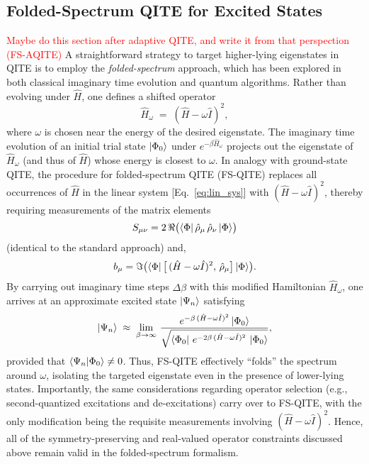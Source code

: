 \documentclass[aip,jcp,amsmath,amssymb, reprint]{revtex4-1}
\begin{document}
\subsection{Folded-Spectrum QITE for Excited States}
\textcolor{red}{Maybe do this section after adaptive QITE, and write it from that perspection (FS-AQITE)}
A straightforward strategy to target higher-lying eigenstates in QITE is to employ the \textit{folded-spectrum} approach, which has been explored in both classical imaginary time evolution and quantum algorithms.\cite{foldedSpectrumRefs} Rather than evolving under $\hat{H}$, one defines a shifted operator
\begin{equation}
\hat{H}_\omega \;=\; (\hat{H} - \omega \hat{I})^2,
\end{equation}
where $\omega$ is chosen near the energy of the desired eigenstate. The imaginary time evolution of an initial trial state $\ket{\Phi_0}$ under $e^{-\beta \hat{H}_\omega}$ projects out the eigenstate of $\hat{H}_\omega$ (and thus of $\hat{H}$) whose energy is closest to $\omega$. In analogy with ground-state QITE, the procedure for folded-spectrum QITE (FS-QITE) replaces all occurrences of $\hat{H}$ in the linear system [Eq.~\eqref{eq:lin_sys}] with $(\hat{H} - \omega \hat{I})^2$, thereby requiring measurements of the matrix elements
\begin{equation}
S_{\mu \nu} = 2\,\Re\bigl(\bra{\Phi} \hat{\rho}_\mu \,\hat{\rho}_\nu \ket{\Phi}\bigr)
\end{equation}
(identical to the standard approach) and,
\begin{equation}
b_{\mu} = \Im\bigl(\bra{\Phi} \bigl[\,(\hat{H}-\omega\hat{I})^2,\, \hat{\rho}_\mu\bigr]\ket{\Phi}\bigr).
\end{equation}
By carrying out imaginary time steps $\Delta \beta$ with this modified Hamiltonian $\hat{H}_\omega$, one arrives at an approximate excited state $\ket{\Psi_n}$ satisfying
\begin{equation}
\ket{\Psi_n} \;\approx\; \lim_{\beta\to\infty}\,\frac{e^{-\beta\,(\hat{H}-\omega\hat{I})^2}\ket{\Phi_0}}
{\sqrt{\bra{\Phi_0}\,e^{-2\beta\,(\hat{H}-\omega\hat{I})^2}\,\ket{\Phi_0}}},
\end{equation}
provided that $\braket{\Psi_n|\Phi_0}\neq 0$. Thus, FS-QITE effectively “folds” the spectrum around $\omega$, isolating the targeted eigenstate even in the presence of lower-lying states. Importantly, the same considerations regarding operator selection (e.g., second-quantized excitations and de-excitations) carry over to FS-QITE, with the only modification being the requisite measurements involving $(\hat{H}-\omega\hat{I})^2$. Hence, all of the symmetry-preserving and real-valued operator constraints discussed above remain valid in the folded-spectrum formalism.
\end{document}
